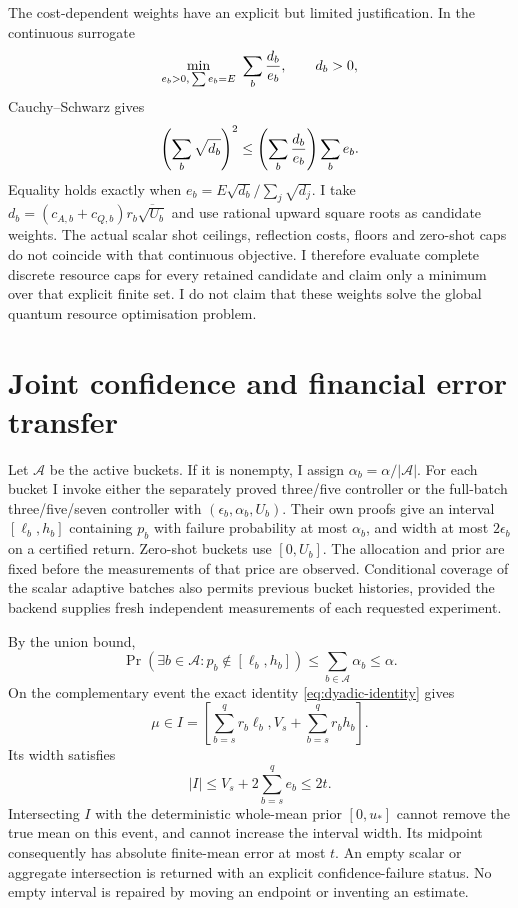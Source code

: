The cost-dependent weights have an explicit but limited justification. In the continuous surrogate
\[
 \min_{e_b>0,\,\sum e_b=E}\ \sum_b{d_b\over e_b},\qquad d_b>0,
\]
Cauchy--Schwarz gives
\[
 \left(\sum_b\sqrt{d_b}\right)^2
 \leq\left(\sum_b{d_b\over e_b}\right)\sum_b e_b.
\]
Equality holds exactly when \(e_b=E\sqrt{d_b}/\sum_j\sqrt{d_j}\). I take
\(d_b=(c_{A,b}+c_{Q,b})r_b\overline{\sqrt{U_b}}\) and use rational upward square roots as candidate weights. The actual scalar shot ceilings, reflection costs, floors and zero-shot caps do not coincide with that continuous objective. I therefore evaluate complete discrete resource caps for every retained candidate and claim only a minimum over that explicit finite set. I do not claim that these weights solve the global quantum resource optimisation problem.

\section{Joint confidence and financial error transfer}
\label{sec:dyadic-confidence}

Let \(\mathcal A\) be the active buckets. If it is nonempty, I assign
\(\alpha_b=\alpha/|\mathcal A|\). For each bucket I invoke either the separately proved three/five controller or the full-batch three/five/seven controller with \((\epsilon_b,\alpha_b,U_b)\). Their own proofs give an interval \([\ell_b,h_b]\) containing \(p_b\) with failure probability at most \(\alpha_b\), and width at most \(2\epsilon_b\) on a certified return. Zero-shot buckets use \([0,U_b]\). The allocation and prior are fixed before the measurements of that price are observed. Conditional coverage of the scalar adaptive batches also permits previous bucket histories, provided the backend supplies fresh independent measurements of each requested experiment.

By the union bound,
\[
 \Pr\left(\exists b\in\mathcal A:p_b\notin[\ell_b,h_b]\right)
 \leq\sum_{b\in\mathcal A}\alpha_b\leq\alpha.
\]
On the complementary event the exact identity \eqref{eq:dyadic-identity} gives
\[
 \mu\in I=\left[\sum_{b=s}^q r_b\ell_b,
                   V_s+\sum_{b=s}^q r_bh_b\right].
\]
Its width satisfies
\[
 |I|\leq V_s+2\sum_{b=s}^q e_b\leq2t.
\]
Intersecting \(I\) with the deterministic whole-mean prior \([0,u_*]\) cannot remove the true mean on this event, and cannot increase the interval width. Its midpoint consequently has absolute finite-mean error at most \(t\). An empty scalar or aggregate intersection is returned with an explicit confidence-failure status. No empty interval is repaired by moving an endpoint or inventing an estimate.

